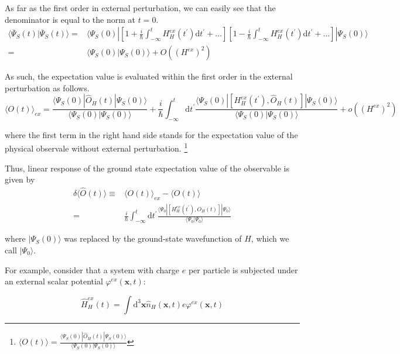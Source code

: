 As far as the first order in external perturbation, we can easily see that the denominator is equal to the norm at $t=0$.
\[\begin{split} \langle \overline{\Psi}_S(t) | \overline{\Psi}_S(t) \rangle =& \langle \Psi_S(0) | \left[ 1 + \frac{i}{\hbar} \int_{-\infty}^{t} H_H^{ex} (t^{'}) \mathrm{d} t^{'} + \ldots \right]
\left[ 1 - \frac{i}{\hbar} \int_{-\infty}^{t} H_H^{ex} (t^{'}) \mathrm{d} t^{'} + \ldots \right] | \Psi_S(0) \rangle\\
=& \langle \Psi_S(0) | \Psi_S(0) \rangle + O((H^{ex})^2)
\end{split}\]

As such, the expectation value is evaluated within the first order in the external perturbation as follows.
\begin{equation} \label{Eqs3.1.8}
\langle O(t) \rangle_{ex} = \frac{\langle \Psi_S(0)|\hat{O}_H(t)|\Psi_S(0)\rangle}{\langle \Psi_S(0)|\Psi_S(0)\rangle} + \frac{i}{\hbar} \int_{-\infty}^{t} \mathrm{d}t^{'} \frac{\langle \Psi_S(0)|\left[ H_H^{ex}(t^{'}), \hat{O}_H(t) \right]|\Psi_S(0)\rangle}{\langle \Psi_S(0)|\Psi_S(0)\rangle} + o((H^{ex})^2)
\end{equation}

where the first term in the right hand side stands for the expectation value of the physical observale without external perturbation.
\footnote{$\langle O(t) \rangle = \frac{\langle \Psi_S(0)|\hat{O}_H(t)|\Psi_S(0)\rangle}{\langle \Psi_S(0)|\Psi_S(0)\rangle}$}

Thus, linear response of the ground state expectation value of the observable is given by
\begin{equation} \label{3.1.9} \begin{split}
\delta \langle \hat{O}(t) \rangle \equiv& \langle O(t) \rangle_{ex} - \langle O(t) \rangle\\
=& \frac{i}{\hbar} \int_{-\infty}^{t} \mathrm{d}t^{'} \frac{\langle \Psi_0 | \left[ H_H^{ex}(t^{'}), O_H(t) \right] | \Psi_0 \rangle}{\langle \Psi_0 | \Psi_0 \rangle}
\end{split}\end{equation}

where $|\Psi_S(0) \rangle$ was replaced by the ground-state wavefunction of $H$, which we call $|\Psi_0 \rangle$.

For example, consider that a system with charge $e$ per particle is subjected under an external scalar potential $\varphi^{ex}(\mathbf{x},t)$:

\begin{equation} \label{Eqs3.1.10}
\hat{H}_H^{ex}(t) = \int \mathrm{d}^3 \mathbf{x} \hat{n}_H(\mathbf{x},t) e \varphi^{ex}(\mathbf{x},t)
\end{equation}

